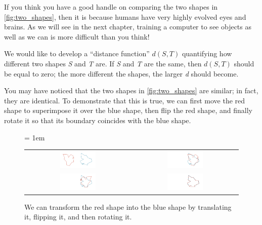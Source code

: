 If you think you have a good handle on comparing the two shapes in \autoref{fig:two_shapes}, then it is because humans have very highly evolved eyes and brains. As we will see in the next chapter, training a computer to see objects as well as we can is more difficult than you think!

We would like to develop a ``distance function'' $d(S, T)$ quantifying how different two shapes \textit{S} and \textit{T} are. If \textit{S} and \textit{T} are the same, then $d(S, T)$ should be equal to zero; the more different the shapes, the larger \textit{d} should become.

You may have noticed that the two shapes in \autoref{fig:two_shapes} are similar; in fact, they are identical. To demonstrate that this is true, we can first move the red shape to superimpose it over the blue shape, then flip the red shape, and finally rotate it so that its boundary coincides with the blue shape.\\

\begin{figure}[h]
	\centering
	\tabcolsep = 1em
	\mySfFamily
	\begin{tabular}{c c}
		\includegraphics[width = 0.35\textwidth]{../images/shape_transformation1.png} & \includegraphics[width = 0.35\textwidth]{../images/shape_transformation2.png} \\ \includegraphics[width = 0.35\textwidth]{../images/shape_transformation3.png} & \includegraphics[width = 0.35\textwidth]{../images/shape_transformation4.png} \\
	\end{tabular}
	\caption{We can transform the red shape into the blue shape by translating it, flipping it, and then rotating it.}
	\label{fig:shape_transformation}
\end{figure}


